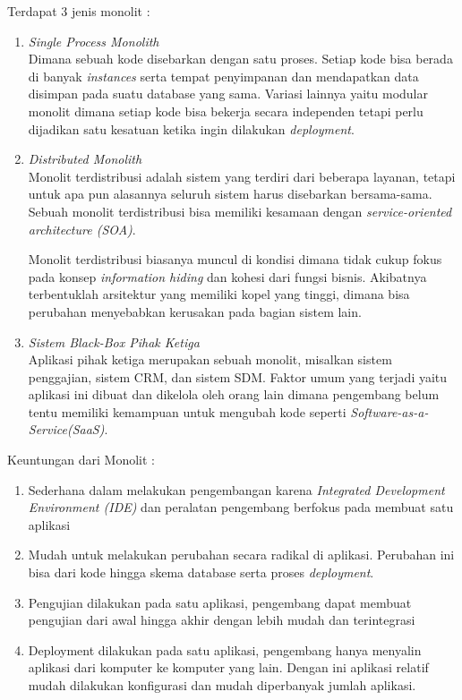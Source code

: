 Terdapat 3 jenis monolit \cite{74C}:
\begin{enumerate}[leftmargin=1.3cm]
\item \textit{Single Process Monolith}\\
Dimana sebuah kode disebarkan dengan satu proses. Setiap kode bisa berada di banyak \textit{instances} serta tempat penyimpanan dan mendapatkan data disimpan pada suatu database yang sama. Variasi lainnya yaitu modular monolit dimana setiap kode bisa bekerja secara independen tetapi perlu dijadikan satu kesatuan ketika ingin dilakukan \textit{deployment}.
\item \textit{Distributed Monolith}\\
Monolit terdistribusi adalah sistem yang terdiri dari beberapa layanan, tetapi untuk apa pun alasannya seluruh sistem harus disebarkan bersama-sama. Sebuah monolit terdistribusi bisa memiliki kesamaan dengan \textit{service-oriented architecture (SOA)}.

Monolit terdistribusi biasanya muncul  di kondisi dimana tidak cukup fokus pada konsep \textit{information hiding} dan kohesi dari fungsi bisnis. Akibatnya terbentuklah arsitektur yang memiliki kopel yang tinggi, dimana bisa perubahan menyebabkan kerusakan pada bagian sistem lain.
\item \textit{Sistem Black-Box Pihak Ketiga}\\
Aplikasi pihak ketiga merupakan sebuah monolit, misalkan sistem penggajian, sistem CRM, dan sistem SDM. Faktor umum yang terjadi yaitu aplikasi ini dibuat dan dikelola oleh orang lain dimana pengembang belum tentu memiliki kemampuan untuk mengubah kode seperti \textit{Software-as-a-Service(SaaS)}.
\end{enumerate}

Keuntungan dari Monolit \cite{ECD,1C7}:
\begin{enumerate}[leftmargin=1.3cm]
\item Sederhana dalam melakukan pengembangan karena \textit{Integrated Development Environment (IDE)} dan peralatan pengembang berfokus pada membuat satu aplikasi
\item Mudah untuk melakukan perubahan secara radikal di aplikasi. Perubahan ini bisa dari kode hingga skema database serta proses \textit{deployment}.
\item Pengujian dilakukan pada satu aplikasi, pengembang dapat membuat pengujian dari awal hingga akhir dengan lebih mudah dan terintegrasi
\item Deployment dilakukan pada satu aplikasi, pengembang hanya menyalin aplikasi dari komputer ke komputer yang lain. Dengan ini aplikasi relatif mudah dilakukan konfigurasi dan mudah diperbanyak jumlah aplikasi.
\end{enumerate}

